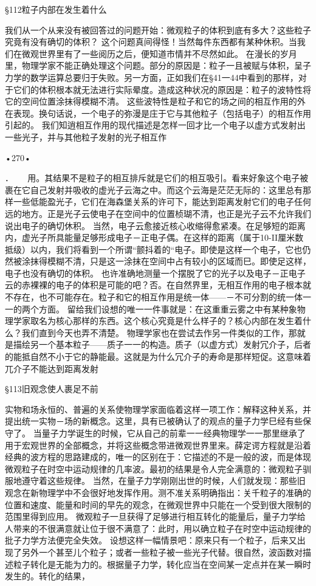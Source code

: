 §112粒子内部在发生着什么

我们从一个从来没有被回答过的问题开始：微观粒子的体积到底有多大？这些粒子究竟有没有确切的体积？
这个问题真间得怪！当然每件东西都有某种休积。当我们在微观世界里有了一些阅历之后，便知道市情并不尽然如此。
在漫长的岁月里，物理学家不能正确处理这个问题。部分的原因是：粒子一且被赋与体积，呈子力学的数学运算总要归于失败。另一方面，正如我们在§41一44中看到的那样，对于它们的体积根本就无法进行实际晕度。造成这种状况的原因是：粒子的波特性将它的空间位置涂抹得模糊不清。
这些波特性是粒子和它的场之间的相互作用的外在表现。换句话说，一个电子的弥漫是庄于它与其他粒子（包括电子）的相互作用引起的。
我们知逍相互作用的现代描述是怎样一回才比一个电子以虚方式发射出一些光子，并与其他粒子发射的光子相互作

•270•

．
  
用。其结果不是粒子的相互排斥就是它们的相互吸引。看来好象这个电子被裹在它自己发射并吸收的虚光子云海之中。而这个云海是茫茫无际的：这里总有那样一些低能盈光子，它们在海森堡关系的许可下，能达到距离发射它们的电子任何远的地方。正是光子云使电子在空间中的位置桢瑚不清，也正是光子云不允许我们说出电子的确切休积。
当然，电子云愈接近核心收缩得愈紧凑。在足够短的距离内，虚光子所具能量足够形成电子－正电子偶。在这样的距离（属于10-II厘米数抵级）以内，我们将看到一个所谓“颤抖着的“电子。即使是这样一个电子，它也仍然被涂抹得模糊不清，只是这一涂抹在空间中占有较小的区域而巳。即使足这样，电子也没有确切的体积。
也许准确地测量一个摆脱了它的光子以及电子－正电子云的赤裸裸的电子的体积是可能的吧？否。在自然界里，无相互作用的电子根本就不存在，也不可能存在。粒子和它的相互作用是统一体——－不可分割的统一体一一的两个方面。
留给我们设想的唯一一件事就是：在这重重云雾之中有某种象物理学家取名为核心那样的东西。这个核心究竟是什么样子的？核心内部在发生着什么？我们直到今天也弄不清楚。
物理学家也在尝试去作另一件类似的工作，那就是描绘另一个基本粒子——质子一一的构造。质子（以虚方式）发射冗介子，后者的能抵自然不小于它的静能最。这就是为什么冗介子的寿命是那样短促。这意味着兀介子不能达到距离发射


§113旧观念使人裹足不前

实物和场永恒的、普遍的关系使物理学家面临着这样一项工作：解释这种关系，并提出统一实物－场的新概念。这里，具有已被确认了的观点的量子力学巳经有些保守了。
当量子力学诞生的时候，它从自己的前辈一一经典物理学一一那里继承了用于宏观世界的全部概念，并将这些概念带进微观世界里来。薛定谔方程就是沿着经典的波方程的思路建成的，唯一的区别在于：它描述的不是一般的波，而是体现微观粒子在时空中运动规律的几率波。最初的结果是令人完全满意的：微观粒子驯服地遵守着这些规律。
当然，在量子力学刚刚出世的时候，人们就发现：那些旧观念在新物理学中不会很好地发挥作用。测不准关系明确指出：关千粒子的准确的位置和速度、能量和时间的早先的观念，在微观世界中只能在一个受到很大限制的范围里得到应用。
微观粒子一旦获得了足够进行相互转化的能量后，量子力学给人带来的不很满意就让位于很不满意了：此时，用以确立粒子在时空中运动规律的批子力学方法便完全失效。
设想这样一幅情景吧：原来只有一个粒子，后来又出现了另外一个甚至儿个粒子；或者一些粒子被一些光子代替。很自然，波函数对描述粒子转化是无能为力的。根据量子力学，转化应当在空间某一定点并在某一瞬时发生的。转化的结果，

